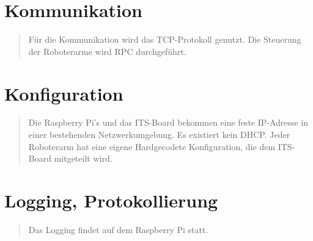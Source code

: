 \begin{quote}
\end{quote}


\section{Kommunikation}

\begin{quote}
	Für die Kommunikation wird das TCP-Protokoll genutzt. Die Steuerung der Roboterarme wird RPC durchgeführt.
\end{quote}

\section{Konfiguration}

\begin{quote}
	Die Raspberry Pi's und das ITS-Board bekommen eine feste IP-Adresse in einer bestehenden Netzwerkumgebung. Es existiert kein DHCP.
	Jeder Roboterarm hat eine eigene Hardgecodete Konfiguration, die dem ITS-Board mitgeteilt wird.
\end{quote}

\section{Logging, Protokollierung}

\begin{quote}
	
	Das Logging findet auf dem Raspberry Pi statt.
\end{quote}

%

